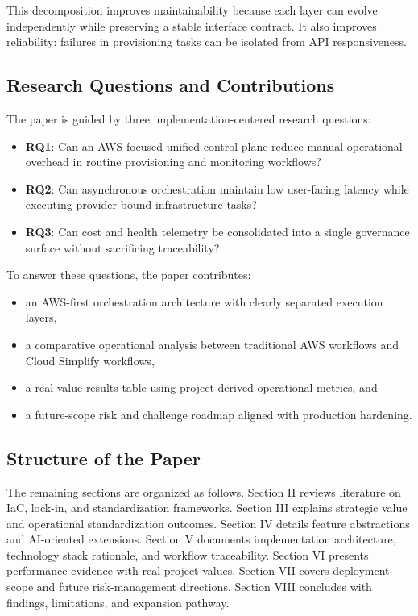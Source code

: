 This decomposition improves maintainability because each layer can evolve independently while preserving a stable interface contract. It also improves reliability: failures in provisioning tasks can be isolated from API responsiveness.

\subsection{Research Questions and Contributions}
The paper is guided by three implementation-centered research questions:
\begin{itemize}
    \item \textbf{RQ1}: Can an AWS-focused unified control plane reduce manual operational overhead in routine provisioning and monitoring workflows?
    \item \textbf{RQ2}: Can asynchronous orchestration maintain low user-facing latency while executing provider-bound infrastructure tasks?
    \item \textbf{RQ3}: Can cost and health telemetry be consolidated into a single governance surface without sacrificing traceability?
\end{itemize}

To answer these questions, the paper contributes:
\begin{itemize}
    \item an AWS-first orchestration architecture with clearly separated execution layers,
    \item a comparative operational analysis between traditional AWS workflows and Cloud Simplify workflows,
    \item a real-value results table using project-derived operational metrics, and
    \item a future-scope risk and challenge roadmap aligned with production hardening.
\end{itemize}

\subsection{Structure of the Paper}
The remaining sections are organized as follows. Section II reviews literature on IaC, lock-in, and standardization frameworks. Section III explains strategic value and operational standardization outcomes. Section IV details feature abstractions and AI-oriented extensions. Section V documents implementation architecture, technology stack rationale, and workflow traceability. Section VI presents performance evidence with real project values. Section VII covers deployment scope and future risk-management directions. Section VIII concludes with findings, limitations, and expansion pathway.
